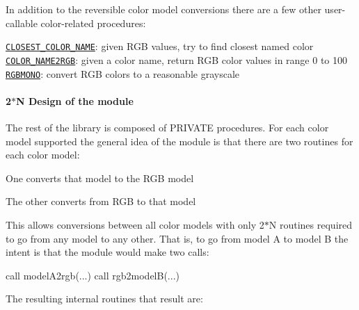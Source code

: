 \begin{DoxyDescription}
In addition to the reversible color model conversions there are a few other user-\/callable color-\/related procedures\+: 




\begin{DoxyPre}
    \href{closest_color_name.3.html}{\tt CLOSEST\_COLOR\_NAME}:  given RGB values, try to find closest named color
    \href{color_name2rgb.3.html}{\tt COLOR\_NAME2RGB}:  given a color name, return RGB color values in range 0 to 100
    \href{rgbmono.3.html}{\tt RGBMONO}:  convert RGB colors to a reasonable grayscale
 \end{DoxyPre}


\paragraph*{2$\ast$N Design of the module}





The rest of the library is composed of P\+R\+I\+V\+A\+TE procedures. For each color model supported the general idea of the module is that there are two routines for each color model\+: 




\begin{DoxyItemize}
\item One converts that model to the R\+GB model  
\item The other converts from R\+GB to that model  
\end{DoxyItemize}



This allows conversions between all color models with only 2$\ast$N routines required to go from any model to any other. That is, to go from model A to model B the intent is that the module would make two calls\+: 




\begin{DoxyPre}
     call modelA2rgb(...)
     call rgb2modelB(...)
 \end{DoxyPre}




The resulting internal routines that result are\+: 





\end{DoxyDescription}
